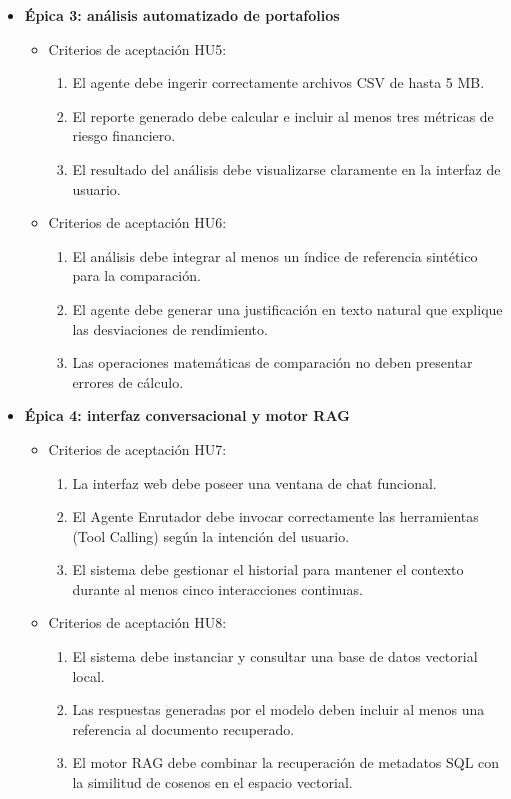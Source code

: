 \documentclass[
11pt, %
]{charter}
\begin{document}
\begin{itemize}
  \item \textbf{\'{E}pica 3: análisis automatizado de portafolios}
    \begin{itemize}
      \item Criterios de aceptación HU5:
        \begin{enumerate}
          \item El agente debe ingerir correctamente archivos CSV de hasta 5 MB.
          \item El reporte generado debe calcular e incluir al menos tres métricas de riesgo financiero.
          \item El resultado del análisis debe visualizarse claramente en la interfaz de usuario.
        \end{enumerate}
      \item Criterios de aceptación HU6:
        \begin{enumerate}
          \item El análisis debe integrar al menos un índice de referencia sintético para la comparación.
          \item El agente debe generar una justificación en texto natural que explique las desviaciones de rendimiento.
          \item Las operaciones matemáticas de comparación no deben presentar errores de cálculo.
        \end{enumerate}
    \end{itemize}
    
  \item \textbf{\'{E}pica 4: interfaz conversacional y motor RAG}
    \begin{itemize}
      \item Criterios de aceptación HU7:
        \begin{enumerate}
          \item La interfaz web debe poseer una ventana de chat funcional.
          \item El Agente Enrutador debe invocar correctamente las herramientas (Tool Calling) según la intención del usuario.
          \item El sistema debe gestionar el historial para mantener el contexto durante al menos cinco interacciones continuas.
        \end{enumerate}
      \item Criterios de aceptación HU8:
        \begin{enumerate}
          \item El sistema debe instanciar y consultar una base de datos vectorial local.
          \item Las respuestas generadas por el modelo deben incluir al menos una referencia al documento recuperado.
          \item El motor RAG debe combinar la recuperación de metadatos SQL con la similitud de cosenos en el espacio vectorial.
        \end{enumerate}
    \end{itemize}
\end{itemize}
\end{document}
